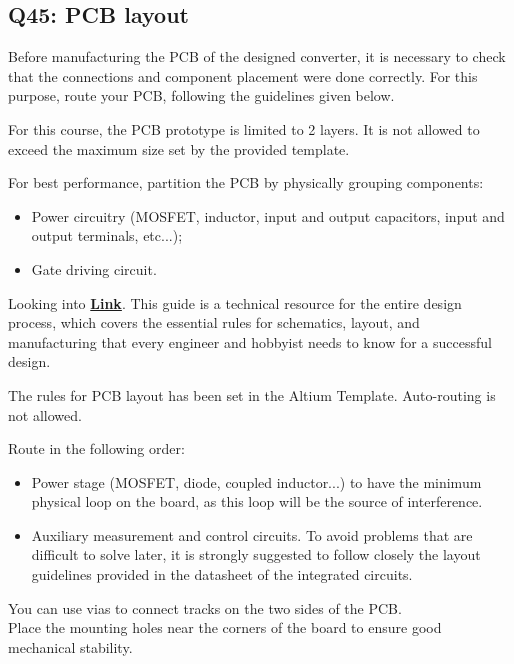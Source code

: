 \documentclass{PELsmallreport}
\begin{document}
\subsection{Q45: PCB layout}
Before manufacturing the PCB of the designed converter, it is necessary to check that the connections and component placement were
done correctly. For this purpose, route your PCB, following the guidelines given below.

For this course, the PCB prototype is limited to 2 layers. It is not allowed to exceed the maximum size set by the provided template.

For best performance, partition the PCB by physically grouping components:

\begin{itemize}
\item Power circuitry (MOSFET, inductor, input and output capacitors, input and output terminals, etc...);
\item Gate driving circuit.
\end{itemize}

Looking into \href{https://jlcpcb.com/blog/pcb-design-rules-best-practices}{\textbf{Link}}. This guide is a technical resource for the entire design process, which covers the essential rules for schematics, layout, and manufacturing that every engineer and hobbyist needs to know for a successful design.

The rules for PCB layout has been set in the Altium Template. Auto-routing is not allowed. 

Route in the following order:

\begin{itemize}
\item Power stage (MOSFET, diode, coupled inductor...) to have the minimum physical loop on the board, as this loop will be the source
of interference.

\item Auxiliary measurement and control circuits. To avoid problems that are difficult to solve later, it is strongly suggested to follow closely the layout guidelines provided in the datasheet of the integrated circuits.\\
\end{itemize}
You can use vias to connect tracks on the two sides of the PCB. \\

Place the mounting holes near the corners of the board to ensure good mechanical stability.\\
\end{document}
